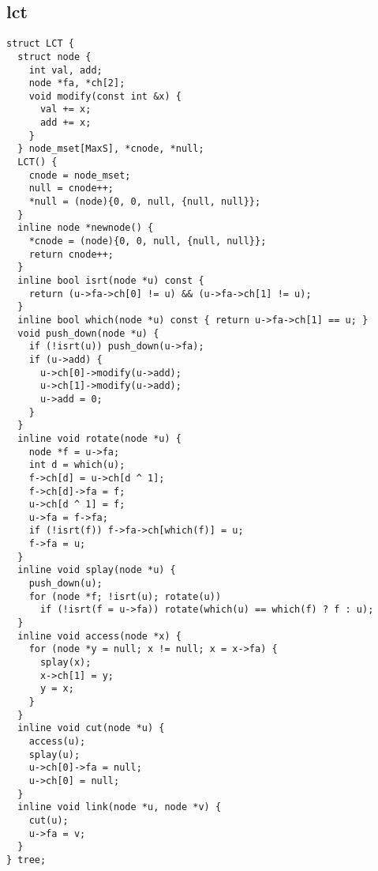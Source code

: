 \documentclass[twoside]{article}
\begin{document}
\subsection{lct}
\begin{lstlisting}
struct LCT {
  struct node {
    int val, add;
    node *fa, *ch[2];
    void modify(const int &x) {
      val += x;
      add += x;
    }
  } node_mset[MaxS], *cnode, *null;
  LCT() {
    cnode = node_mset;
    null = cnode++;
    *null = (node){0, 0, null, {null, null}};
  }
  inline node *newnode() {
    *cnode = (node){0, 0, null, {null, null}};
    return cnode++;
  }
  inline bool isrt(node *u) const {
    return (u->fa->ch[0] != u) && (u->fa->ch[1] != u);
  }
  inline bool which(node *u) const { return u->fa->ch[1] == u; }
  void push_down(node *u) {
    if (!isrt(u)) push_down(u->fa);
    if (u->add) {
      u->ch[0]->modify(u->add);
      u->ch[1]->modify(u->add);
      u->add = 0;
    }
  }
  inline void rotate(node *u) {
    node *f = u->fa;
    int d = which(u);
    f->ch[d] = u->ch[d ^ 1];
    f->ch[d]->fa = f;
    u->ch[d ^ 1] = f;
    u->fa = f->fa;
    if (!isrt(f)) f->fa->ch[which(f)] = u;
    f->fa = u;
  }
  inline void splay(node *u) {
    push_down(u);
    for (node *f; !isrt(u); rotate(u))
      if (!isrt(f = u->fa)) rotate(which(u) == which(f) ? f : u);
  }
  inline void access(node *x) {
    for (node *y = null; x != null; x = x->fa) {
      splay(x);
      x->ch[1] = y;
      y = x;
    }
  }
  inline void cut(node *u) {
    access(u);
    splay(u);
    u->ch[0]->fa = null;
    u->ch[0] = null;
  }
  inline void link(node *u, node *v) {
    cut(u);
    u->fa = v;
  }
} tree;

\end{lstlisting}
\end{document}
